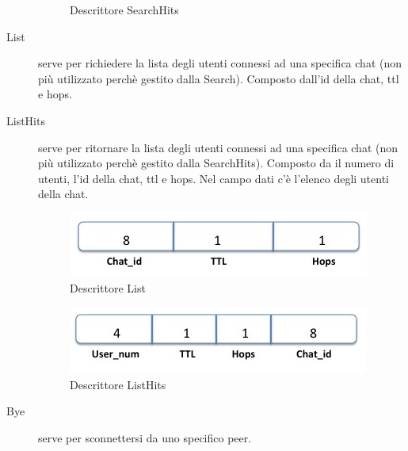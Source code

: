 \begin{description}
\begin{figure}[H]
\begin{center}
\caption{Descrittore SearchHits}
\label{searchhits}
\end{center}
\end{figure}
\item[List] serve per richiedere la lista degli utenti connessi ad una specifica chat (non più utilizzato perchè gestito dalla Search). Composto dall’id della chat, ttl e hops.
\item[ListHits] serve per ritornare la lista degli utenti connessi ad una specifica chat (non più utilizzato perchè gestito dalla SearchHits). Composto da il numero di utenti, l'id della chat, ttl e hops. Nel campo dati c'è l'elenco degli utenti della chat.
\begin{figure}[H]
\begin{center}
\includegraphics[scale=0.7]{etc/list.jpg}
\caption{Descrittore List}
\label{list}
\end{center}
\end{figure}
\begin{figure}[H]
\begin{center}
\includegraphics[scale=0.7]{etc/listhits.jpg}
\caption{Descrittore ListHits}
\label{list}
\end{center}
\end{figure}
\item[Bye] serve per sconnettersi da uno specifico peer.
\end{description}


